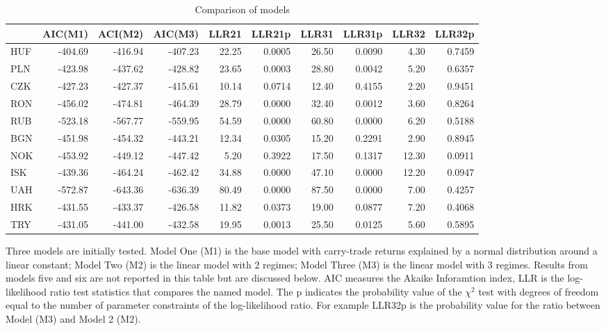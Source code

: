 \documentclass[12pt, a4paper, oneside]{article} %
\begin{document}
\begin{landscape}
\begin{table}[ht]
\begin{threeparttable}
\centering
\begin{tabular}{l|rrrrrrrrr}
  \hline
 & AIC(M1) & ACI(M2) & AIC(M3) & LLR21 & LLR21p & LLR31 & LLR31p & LLR32 & LLR32p \\ 
  \hline
HUF & -404.69 & -416.94 & -407.23 & 22.25 & 0.0005 & 26.50 & 0.0090 & 4.30 & 0.7459 \\ 
  PLN & -423.98 & -437.62 & -428.82 & 23.65 & 0.0003 & 28.80 & 0.0042 & 5.20 & 0.6357 \\ 
  CZK & -427.23 & -427.37 & -415.61 & 10.14 & 0.0714 & 12.40 & 0.4155 & 2.20 & 0.9451 \\ 
  RON & -456.02 & -474.81 & -464.39 & 28.79 & 0.0000 & 32.40 & 0.0012 & 3.60 & 0.8264 \\ 
  RUB & -523.18 & -567.77 & -559.95 & 54.59 & 0.0000 & 60.80 & 0.0000 & 6.20 & 0.5188 \\ 
  BGN & -451.98 & -454.32 & -443.21 & 12.34 & 0.0305 & 15.20 & 0.2291 & 2.90 & 0.8945 \\ 
  NOK & -453.92 & -449.12 & -447.42 & 5.20 & 0.3922 & 17.50 & 0.1317 & 12.30 & 0.0911 \\ 
  ISK & -439.36 & -464.24 & -462.42 & 34.88 & 0.0000 & 47.10 & 0.0000 & 12.20 & 0.0947 \\ 
  UAH & -572.87 & -643.36 & -636.39 & 80.49 & 0.0000 & 87.50 & 0.0000 & 7.00 & 0.4257 \\ 
  HRK & -431.55 & -433.37 & -426.58 & 11.82 & 0.0373 & 19.00 & 0.0877 & 7.20 & 0.4068 \\ 
  TRY & -431.05 & -441.00 & -432.58 & 19.95 & 0.0013 & 25.50 & 0.0125 & 5.60 & 0.5895 \\ 
   \hline
\end{tabular}
 
\label{tabref:comptab2}
\begin{tablenotes}
\small
\item Three models are initially tested.  Model One (M1) is the base model with carry-trade returns explained by a normal distribution around a linear constant; Model Two (M2) is the linear model with 2 regimes; Model Three (M3) is the linear model with 3 regimes.  Results from models five and six are not reported in this table but are discussed below. AIC measures the Akaike Inforamtion index, LLR is the log-likelihood ratio test statistics that compares the named model.  The p indicates the probability value of the $\chi^2$ test with degrees of freedom equal to the number of parameter constraints of the log-likelihood ratio.  For example LLR32p is the probability value for the ratio between Model (M3) and Model 2 (M2).
\end{tablenotes}
\caption{Comparison of models}
\end{threeparttable}
\end{table} 
\end{landscape}
\end{document}

